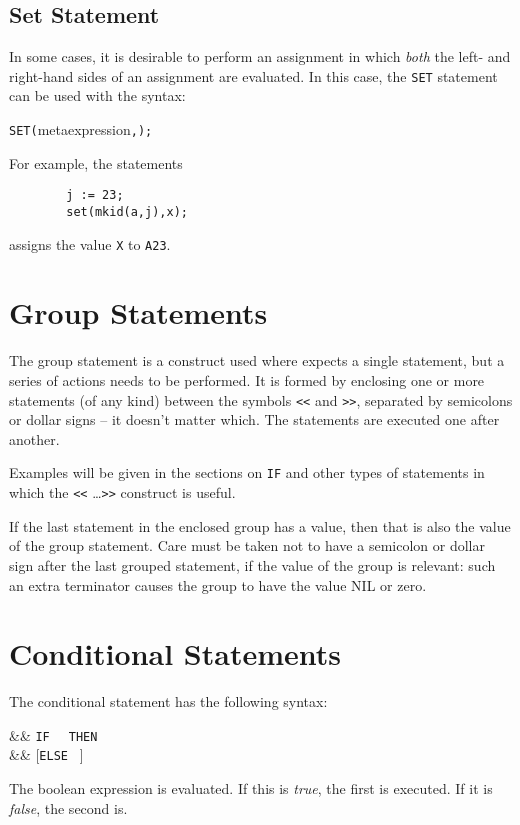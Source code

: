 \subsection{Set Statement}
\hypertarget{command:SET}{}

In some cases, it is desirable to perform an assignment in which \emph{both}
the left- and right-hand sides of an assignment are
evaluated.  In this case, the \texttt{SET} statement can be used
with the syntax:
\begin{syntax}
        \texttt{SET(}meta{expression}\texttt{,}\texttt{);}
\end{syntax}
For example, the statements
\begin{verbatim}
        j := 23;
        set(mkid(a,j),x);
\end{verbatim}
assigns the value \texttt{X} to \texttt{A23}.

\section{Group Statements}

The group statement is a construct used where
{\REDUCE} expects a single statement, but a series of actions needs to be
performed.  It is formed by enclosing one or more statements (of any kind)
between the symbols \texttt{<<} and \texttt{>>}, separated by semicolons or
dollar signs -- it doesn't matter which.  The statements are executed one
after another.

Examples will be given in the sections on \texttt{IF} and other
types of statements in which the \texttt{<<} \ldots \texttt{>>} construct is
useful.

If the last statement in the enclosed group has a value, then that is also
the value of the group statement.  Care must be taken not to have a
semicolon or dollar sign after the last grouped statement, if the value of
the group is relevant: such an extra terminator causes the group to have
the value NIL or zero.

\section{Conditional Statements}
\hypertarget{command:IF}{}
\hypertarget{reserved:THEN}{}
\hypertarget{reserved:ELSE}{}

The conditional statement has the following
syntax:
\begin{syntaxtable}
  &\bnfprod &
    \texttt{IF }  \texttt{ THEN }  \\
      && [\texttt{ELSE } ]
\end{syntaxtable}
The boolean expression is evaluated. If this is \emph{true}, the first
 is executed.  If it is \emph{false}, the second is.

